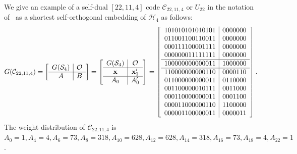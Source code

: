 \documentclass{article}
\theoremstyle{definition}
\theoremstyle{remark}
\begin{document}
We give an example of a self-dual $[22, 11, 4]$ code $\mathcal C_{22,11,4}$ or $U_{22}$ in the notation of~\cite{Pless1975} as a shortest self-orthogonal embedding of $\mathcal H_4$ as follows:
\[
G(\mathcal C_{22,11,4})
= \left[ \begin{array}{c|c}
G(\mathcal S_4) & \mathcal{O} \\
\hline
A  & B \\
\end{array}
\right]
= \left[ \begin{array}{c|c}
G(\mathcal S_4) & \mathcal{O} \\
\hline
{\bf{x}} & {\bf{x}}_1'\\
\hline
A_0   & A_0' \\
\end{array}
\right] = \left[
\begin{array}{c|c}
1 0 1 0 1 0 1 0 1 0 1 0 1 0 1 & 0 0 0 0 0 0 0\\
0 1 1 0 0 1 1 0 0 1 1 0 0 1 1 & 0 0 0 0 0 0 0\\
0 0 0 1 1 1 1 0 0 0 0 1 1 1 1 & 0 0 0 0 0 0 0\\
0 0 0 0 0 0 0 1 1 1 1 1 1 1 1 & 0 0 0 0 0 0 0\\
\hline
1 0 0 0 0 0 0 0 0 0 0 0 0 1 1 & 1 0 0 0 0 0 0 \\
\hline
1 1 0 0 0 0 0 0 0 0 0 0 1 1 0 & 0 0 0 0 1 1 0 \\
0 1 1 0 0 0 0 0 0 0 0 0 0 1 1 & 0 1 1 0 0 0 0 \\
0 0 1 1 0 0 0 0 0 0 1 0 1 1 1 & 0 0 1 1 0 0 0 \\
0 0 0 1 1 0 0 0 0 0 0 0 0 1 1 & 0 0 0 1 1 0 0 \\
0 0 0 0 1 1 0 0 0 0 0 0 1 1 0 & 1 1 0 0 0 0 0 \\
0 0 0 0 0 1 1 0 0 0 0 0 0 1 1 & 0 0 0 0 0 1 1 \\
\end{array}
\right].
\]
The weight distribution of $\mathcal C_{22,11,4}$ is $A_0 =1, A_4 =4, A_6 =73, A_8=318, A_{10} =628, A_{12}=628, A_{14}=318, A_{16}=73, A_{18}=4, A_{22}=1$.
\end{document}
